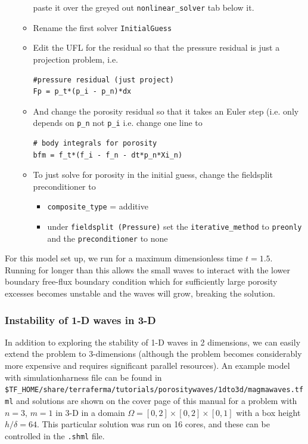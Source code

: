\begin{itemize}
\begin{itemize}
    paste it over the greyed out \texttt{nonlinear\_solver} tab below
    it.
  \item Rename the first solver \texttt{InitialGuess}
  \item Edit the UFL for the residual so that the pressure residual is
    just a projection problem, i.e.
    \begin{lstlisting}[style=UFL]
#pressure residual (just project)
Fp = p_t*(p_i - p_n)*dx
    \end{lstlisting}
  \item And change the porosity residual so that it takes an Euler
    step (i.e. only depends on \texttt{p\_n} not \texttt{p\_i}
    i.e. change one line to
    \begin{lstlisting}[style=UFL]
# body integrals for porosity
bfm = f_t*(f_i - f_n - dt*p_n*Xi_n)
    \end{lstlisting}
  \item To just solve for porosity in the initial guess, change the
    fieldsplit preconditioner to
    \begin{itemize}
    \item \texttt{composite\_type} = additive
    \item under \texttt{fieldsplit (Pressure)} set the
      \texttt{iterative\_method} to \texttt{preonly} and the
      \texttt{preconditioner} to none
    \end{itemize}



  \end{itemize}



\end{itemize}
 

For this model set up, we run for a maximum dimensionless time
$t=1.5$.  Running for longer than this allows the small waves to
interact with the lower boundary free-flux boundary condition which
for sufficiently large porosity excesses becomes unstable and the
waves will grow, breaking the solution.

\subsubsection{Instability of 1-D waves in 3-D}
\label{sec:instability-1-d3d}

In addition to exploring the stability of 1-D waves in 2 dimensions,
we can easily extend the problem to 3-dimensions (although the problem
becomes considerably more expensive and requires significant parallel
resources).  An example model with simulationharness file can be found in
\texttt{\$TF\_HOME/share/terraferma/tutorials/porositywaves/1dto3d/magmawaves.tfml}
and solutions are shown on the cover page of this manual for a problem
with $n=3$, $m=1$ in 3-D in a domain
$\Omega=[0,2]\times[0,2]\times[0,1]$ with a box height $h/\delta =
64$.  This particular solution was run on 16 cores, and these can be
controlled in the \texttt{.shml} file.

